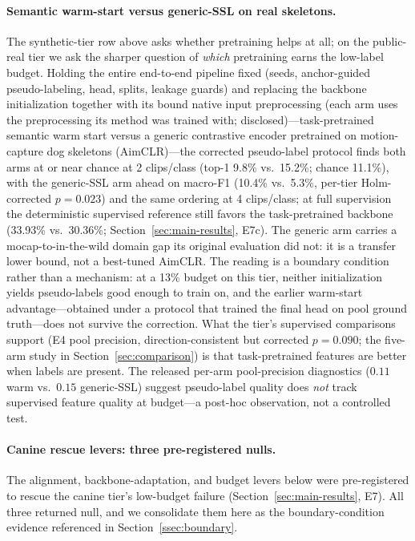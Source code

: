\paragraph{Semantic warm-start versus generic-SSL on real skeletons.}
The synthetic-tier row above asks whether pretraining helps at all; on the public-real tier we ask the sharper question of \emph{which} pretraining earns the low-label budget. Holding the entire end-to-end pipeline fixed (seeds, anchor-guided pseudo-labeling, head, splits, leakage guards) and replacing the backbone initialization together with its bound native input preprocessing (each arm uses the preprocessing its method was trained with; disclosed)---task-pretrained semantic warm start versus a generic contrastive encoder pretrained on motion-capture dog skeletons (AimCLR)---the corrected pseudo-label protocol finds both arms at or near chance at 2 clips/class (top-1 9.8\% vs.\ 15.2\%; chance 11.1\%), with the generic-SSL arm ahead on macro-F1 (10.4\% vs.\ 5.3\%, per-tier Holm-corrected $p=0.023$) and the same ordering at 4 clips/class; at full supervision the deterministic supervised reference still favors the task-pretrained backbone (33.93\% vs.\ 30.36\%; Section~\ref{sec:main-results}, E7c). The generic arm carries a mocap-to-in-the-wild domain gap its original evaluation did not: it is a transfer lower bound, not a best-tuned AimCLR. The reading is a boundary condition rather than a mechanism: at a 13\% budget on this tier, neither initialization yields pseudo-labels good enough to train on, and the earlier warm-start advantage---obtained under a protocol that trained the final head on pool ground truth---does not survive the correction. What the tier's supervised comparisons support (E4 pool precision, direction-consistent but corrected $p=0.090$; the five-arm study in Section~\ref{sec:comparison}) is that task-pretrained features are better when labels are present. The released per-arm pool-precision diagnostics ($0.11$ warm vs.\ $0.15$ generic-SSL) suggest pseudo-label quality does \emph{not} track supervised feature quality at budget---a post-hoc observation, not a controlled test.

\paragraph{Canine rescue levers: three pre-registered nulls.}
The alignment, backbone-adaptation, and budget levers below were pre-registered to rescue the canine tier's low-budget failure (Section~\ref{sec:main-results}, E7). All three returned null, and we consolidate them here as the boundary-condition evidence referenced in Section~\ref{ssec:boundary}.

